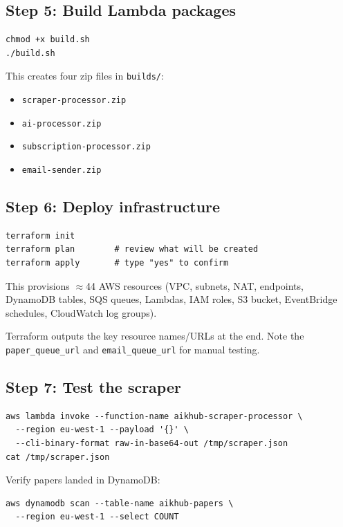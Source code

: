 \documentclass[11pt,a4paper]{article}
\begin{document}
\subsection{Step 5: Build Lambda packages}

\begin{lstlisting}[basicstyle=\ttfamily\small]
chmod +x build.sh
./build.sh
\end{lstlisting}

This creates four zip files in \texttt{builds/}:
\begin{itemize}[leftmargin=*]
  \item \texttt{scraper-processor.zip}
  \item \texttt{ai-processor.zip}
  \item \texttt{subscription-processor.zip}
  \item \texttt{email-sender.zip}
\end{itemize}

\subsection{Step 6: Deploy infrastructure}

\begin{lstlisting}[basicstyle=\ttfamily\small]
terraform init
terraform plan        # review what will be created
terraform apply       # type "yes" to confirm
\end{lstlisting}

This provisions ${\approx}$44 AWS resources (VPC, subnets, NAT, endpoints, DynamoDB tables, SQS queues, Lambdas, IAM roles, S3 bucket, EventBridge schedules, CloudWatch log groups).

Terraform outputs the key resource names/URLs at the end. Note the \texttt{paper\_queue\_url} and \texttt{email\_queue\_url} for manual testing.

\subsection{Step 7: Test the scraper}

\begin{lstlisting}[basicstyle=\ttfamily\small]
aws lambda invoke --function-name aikhub-scraper-processor \
  --region eu-west-1 --payload '{}' \
  --cli-binary-format raw-in-base64-out /tmp/scraper.json
cat /tmp/scraper.json
\end{lstlisting}

Verify papers landed in DynamoDB:
\begin{lstlisting}[basicstyle=\ttfamily\small]
aws dynamodb scan --table-name aikhub-papers \
  --region eu-west-1 --select COUNT
\end{lstlisting}
\end{document}
